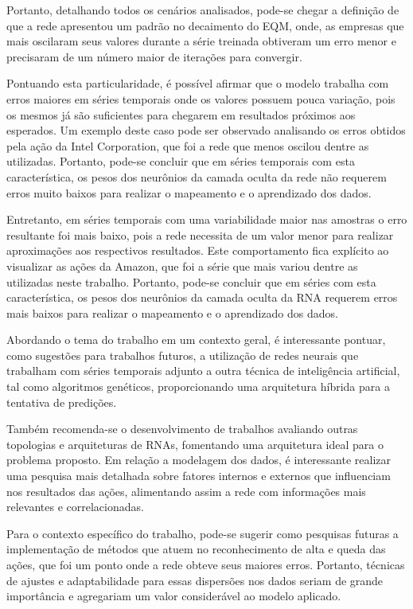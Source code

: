 Portanto, detalhando todos os cenários analisados, pode-se chegar a definição de que a rede apresentou um padrão no decaimento do EQM, onde, as empresas que mais oscilaram seus valores durante a série treinada obtiveram um erro menor e precisaram de um número maior de iterações para convergir. 

Pontuando esta particularidade, é possível afirmar que o modelo trabalha com erros maiores em séries temporais onde os valores possuem pouca variação, pois os mesmos já são suficientes para chegarem em resultados próximos aos esperados. Um exemplo deste caso pode ser observado analisando os erros obtidos pela ação da Intel Corporation, que foi a rede que menos oscilou dentre as utilizadas. Portanto, pode-se concluir que em séries temporais com esta característica, os pesos dos neurônios da camada oculta da rede não requerem erros muito baixos para realizar o mapeamento e o aprendizado dos dados. 

Entretanto, em séries temporais com uma variabilidade maior nas amostras o erro resultante foi mais baixo, pois a rede necessita de um valor menor para realizar aproximações aos respectivos resultados. Este comportamento fica explícito ao visualizar as ações da Amazon, que foi a série que mais variou dentre as utilizadas neste trabalho. Portanto, pode-se concluir que em séries com esta característica, os pesos dos neurônios da camada oculta da RNA requerem erros mais baixos para realizar o mapeamento e o aprendizado dos dados.

Abordando o tema do trabalho em um contexto geral, é interessante pontuar, como sugestões para trabalhos futuros, a utilização de redes neurais que trabalham com séries temporais adjunto a outra técnica de inteligência artificial, tal como algoritmos genéticos, proporcionando uma arquitetura híbrida para a tentativa de predições. 

Também recomenda-se o desenvolvimento de trabalhos avaliando outras topologias e arquiteturas de RNAs, fomentando uma arquitetura ideal para o problema proposto. Em relação a modelagem dos dados, é interessante realizar uma pesquisa mais detalhada sobre fatores internos e externos que influenciam nos resultados das ações, alimentando assim a rede com informações mais relevantes e correlacionadas.

Para o contexto específico do trabalho, pode-se sugerir como pesquisas futuras a implementação de métodos que atuem no reconhecimento de alta e queda das ações, que foi um ponto onde a rede obteve seus maiores erros. Portanto, técnicas de ajustes e adaptabilidade para essas dispersões nos dados seriam de grande importância e agregariam um valor considerável ao modelo aplicado.     